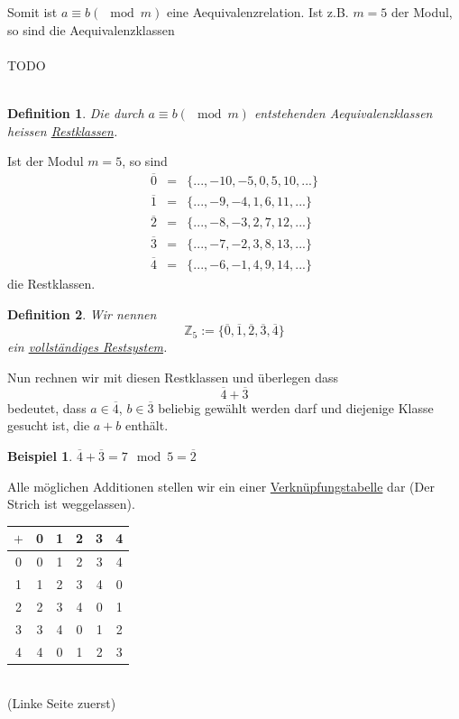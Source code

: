 \documentclass{report}
\newtheorem{mydef}{Definition}
\newtheorem{myexample}{Beispiel}
\begin{document}
Somit ist $a \equiv b (\mod{m})$ eine Aequivalenzrelation. Ist z.B. $m = 5$ der Modul, so sind die Aequivalenzklassen
\\\\TODO\\\\
\begin{mydef}Die durch $a \equiv b (\mod{m})$ entstehenden Aequivalenzklassen heissen \underline{Restklassen}.\end{mydef}
Ist der Modul $m=5$, so sind
\begin{eqnarray}\overline{0} & = & \{..., -10, -5, 0, 5, 10, ...\} \nonumber \\
\overline{1} & = & \{..., -9, -4, 1, 6, 11, ...\} \nonumber \\
\overline{2} & = & \{..., -8, -3, 2, 7, 12, ...\}\nonumber \\
\overline{3} & = & \{..., -7, -2, 3, 8, 13, ...\}\nonumber \\
\overline{4} & = & \{..., -6, -1, 4, 9, 14, ...\}\end{eqnarray}
die Restklassen.
\begin{mydef}Wir nennen
\begin{equation}\mathbb{Z}_5 := \{\overline{0}, \overline{1}, \overline{2}, \overline{3}, \overline{4}\}\end{equation} ein \underline{vollständiges Restsystem}.\end{mydef}
Nun rechnen wir mit diesen Restklassen und überlegen dass
\begin{equation}\overline{4} + \overline{3}\end{equation}
bedeutet, dass $a \in \overline{4}$, $b \in \overline{3}$ beliebig gewählt werden darf und diejenige Klasse gesucht ist, die $a + b$ enthält.
\begin{myexample}$\overline{4} + \overline{3} = 7 \mod{5} = \overline{2}$\end{myexample}
Alle möglichen Additionen stellen wir ein einer \underline{Verknüpfungstabelle} dar (Der Strich ist weggelassen).
\begin{center}\begin{tabular}{c | c c c c c}
$+$ & 0 & 1 & 2 & 3 & 4 \\
\hline
0 & 0 & 1 & 2 & 3 & 4 \\
1 & 1 & 2 & 3 & 4 & 0 \\
2 & 2 & 3 & 4 & 0 & 1 \\
3 & 3 & 4 & 0 & 1 & 2 \\
4 & 4 & 0 & 1 & 2 & 3\end{tabular}\\(Linke Seite zuerst)\end{center}
\end{document}
